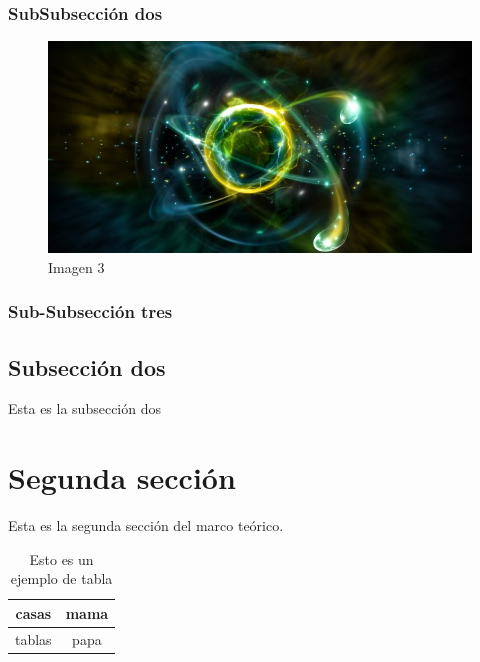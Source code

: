 		\subsubsection{SubSubsección dos}
	\begin{figure}[htb]
	\centering
	\includegraphics[scale=0.4]{Img/3.png}
	\caption{Imagen 3}
	\end{figure}
		\subsubsection{Sub-Subsección tres}
	\subsection{Subsecci\'on dos}
	Esta es la subsecci\'on dos

\section{Segunda sección}
Esta es la segunda secci\'on del marco te\'orico.
\begin{table}[htb]
\centering
\caption[Tabla 1]{Esto es un ejemplo de tabla}
\begin{tabular}{|c|c|}
\hline 
casas & mama \\ 
\hline 
tablas & papa \\ 
\hline 
\end{tabular} 
\end{table}
